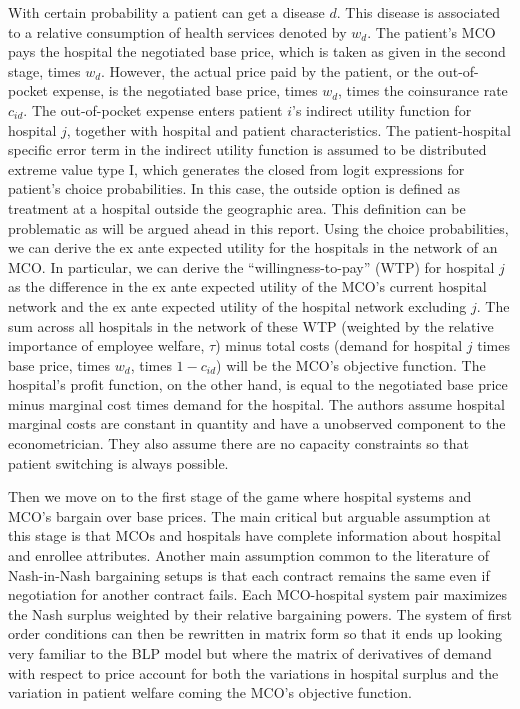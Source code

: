 \documentclass[12pt,english]{article}
\begin{document}
With certain probability a patient can get a disease $d$. This disease is associated to a relative consumption of health services denoted by $w_{d}$. The patient's MCO pays the hospital the negotiated base price, which is taken as given in the second stage, times $w_{d}$. However, the actual price paid by the patient, or the out-of-pocket expense, is the negotiated base price, times $w_{d}$, times the coinsurance rate $c_{id}$. The out-of-pocket expense enters patient $i$'s indirect utility function for hospital $j$, together with hospital and patient characteristics. The patient-hospital specific error term in the indirect utility function is assumed to be distributed extreme value type I, which generates the closed from logit expressions for patient's choice probabilities. In this case, the outside option is defined as treatment at a hospital outside the geographic area. This definition can be problematic as will be argued ahead in this report. Using the choice probabilities, we can derive the ex ante expected utility for the hospitals in the network of an MCO. In particular, we can derive the ``willingness-to-pay'' (WTP)  for hospital $j$ as the difference in the ex ante expected utility of the MCO's current hospital network and the ex ante expected utility of the hospital network excluding $j$. The sum across all hospitals in the network of these WTP (weighted by the relative importance of employee welfare, $\tau$) minus total costs (demand for hospital $j$ times base price, times $w_{d}$, times $1-c_{id}$) will be the MCO's objective function. The hospital's profit function, on the other hand, is  equal to the negotiated base price minus marginal cost times demand for the hospital. The authors assume hospital marginal costs are constant in quantity and have a unobserved component to the econometrician. They also assume there are no capacity constraints so that patient switching is always possible. 

Then we move on to the first stage of the game where hospital systems and MCO's bargain over base prices. The main critical but arguable assumption at this stage is that MCOs and hospitals have complete information about hospital and enrollee attributes. Another main assumption common to the literature of Nash-in-Nash bargaining setups is that each contract remains the same even if negotiation for another contract fails. Each MCO-hospital system pair maximizes the Nash surplus weighted by their relative bargaining powers. The system of first order conditions can then be rewritten in matrix form so that it ends up looking very familiar to the BLP model but where the matrix of derivatives of demand with respect to price account for both the variations in hospital surplus and the variation in patient welfare coming the MCO's objective function.
\end{document}

